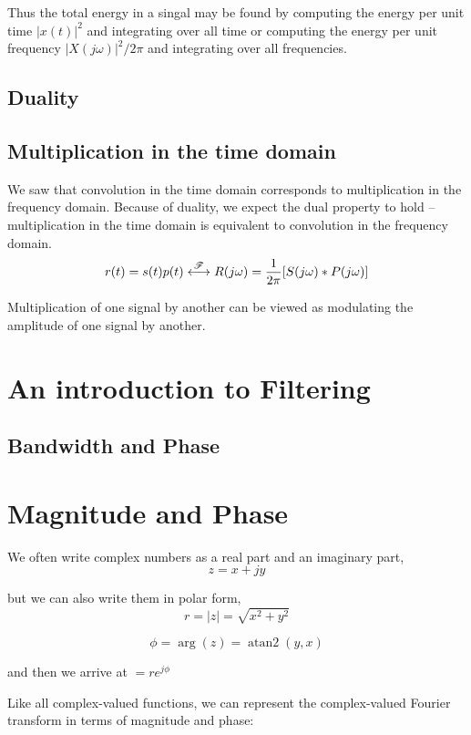 Thus the total energy in a singal may be found by computing the energy per unit time $|x(t)|^2$ and integrating over all time or computing the energy per unit frequency $|X(j\omega)|^2 / 2\pi$ and integrating over all frequencies. 

\subsection{Duality}

\subsection{Multiplication in the time domain}

We saw that convolution in the time domain corresponds to multiplication in the frequency domain. Because of duality, we expect the dual property to hold -- multiplication in the time domain is equivalent to convolution in the frequency domain. 
\[
r(t) = s(t)p(t) \stackrel{\mathscr{F}}{\longleftrightarrow} R(j\omega) = \frac{1}{2\pi}[S(j\omega) * P(j\omega)]
\]

Multiplication of one signal by another can be viewed as modulating the amplitude of one
signal by another. 


\section{An introduction to Filtering}

\subsection{Bandwidth and Phase}



\section{Magnitude and Phase}

We often write complex numbers as a real part and an imaginary part, 
\[
z = x + j y
\]

but we can also write them in polar form, 
\[
r = |z| = \sqrt{x^2 + y^2}
\]

\[
\phi = \operatorname{arg}(z) = \operatorname{atan2} (y, x)
\]

and then we arrive at $ = r e^{j\phi}$ 


Like all complex-valued functions, we can represent the complex-valued Fourier transform 
in terms of magnitude and phase:


